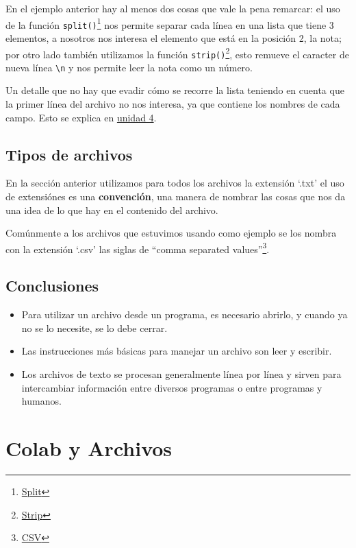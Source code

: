 \documentclass[
  letterpaper,
  DIV=11,
  numbers=noendperiod]{scrreprt}
\providecommand{\tightlist}{%
  \setlength{\itemsep}{0pt}\setlength{\parskip}{0pt}}\usepackage{longtable,booktabs,array}
\begin{document}
En el ejemplo anterior hay al menos dos cosas que vale la pena remarcar:
el uso de la función \texttt{split()}\footnote{\href{https://docs.python.org/es/3/library/stdtypes.html\#str.split}{Split}}
nos permite separar cada línea en una lista que tiene 3 elementos, a
nosotros nos interesa el elemento que está en la posición 2, la nota;
por otro lado también utilizamos la función \texttt{strip()}\footnote{\href{https://docs.python.org/es/3/library/stdtypes.html\#str.strip}{Strip}},
esto remueve el caracter de nueva línea \texttt{\textbackslash{}n} y nos
permite leer la nota como un número.

Un detalle que no hay que evadir cómo se recorre la lista teniendo en
cuenta que la primer línea del archivo no nos interesa, ya que contiene
los nombres de cada campo. Esto se explica en
\hyperref[listas-como-secuencias]{unidad 4}.

\subsection{Tipos de archivos}\label{tipos-de-archivos}

En la sección anterior utilizamos para todos los archivos la extensión
`.txt' el uso de extensiónes es una \textbf{convención}, una manera de
nombrar las cosas que nos da una idea de lo que hay en el contenido del
archivo.

Comúnmente a los archivos que estuvimos usando como ejemplo se los
nombra con la extensión `.csv' las siglas de ``comma separated
values''\footnote{\href{https://es.wikipedia.org/wiki/Valores_separados_por_comas}{CSV}}.

\subsection{Conclusiones}\label{conclusiones}

\begin{itemize}
\tightlist
\item
  Para utilizar un archivo desde un programa, es necesario abrirlo, y
  cuando ya no se lo necesite, se lo debe cerrar.
\item
  Las instrucciones más básicas para manejar un archivo son leer y
  escribir.
\item
  Los archivos de texto se procesan generalmente línea por línea y
  sirven para intercambiar información entre diversos programas o entre
  programas y humanos.
\end{itemize}

\section{Colab y Archivos}\label{colab-y-archivos}
\end{document}
